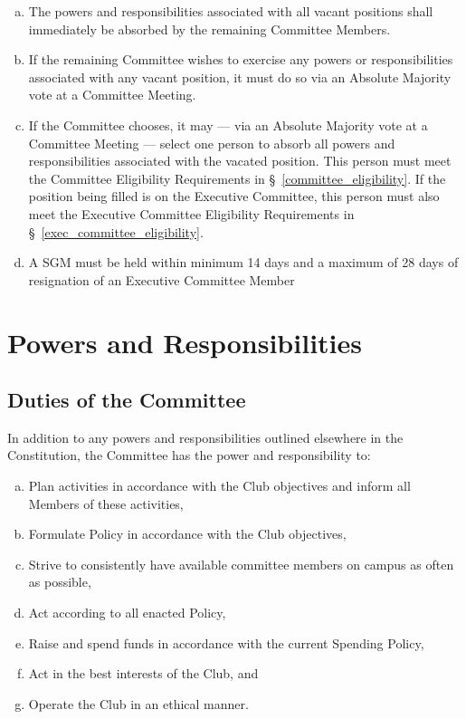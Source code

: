 \documentclass[a4paper,12pt]{article}
\begin{document}
\begin{enumerate}[a)]
	\item The powers and responsibilities associated with all vacant positions shall immediately be absorbed by the remaining Committee Members.
	\item If the remaining Committee wishes to exercise any powers or responsibilities associated with any vacant position, it must do so via an Absolute Majority vote at a Committee Meeting.
	\item If the Committee chooses, it may --- via an Absolute Majority vote at a Committee Meeting --- select one person to absorb all powers and responsibilities associated with the vacated position. This person must meet the Committee Eligibility Requirements in \S~\ref{committee_eligibility}. If the position being filled is on the Executive Committee, this person must also meet the Executive Committee Eligibility Requirements in \S~\ref{exec_committee_eligibility}.
	\item A SGM must be held within minimum 14 days and a maximum of 28 days of resignation of an Executive Committee Member
\end{enumerate}

\section{Powers and Responsibilities}

\subsection{Duties of the Committee}

In addition to any powers and responsibilities outlined elsewhere in the Constitution, the Committee has the power and responsibility to:

\begin{enumerate}[a)]
	\item Plan activities in accordance with the Club objectives and inform all Members of these activities,
	\item Formulate Policy in accordance with the Club objectives,
	\item Strive to consistently have available committee members on campus as often as possible,
	\item Act according to all enacted Policy,
	\item Raise and spend funds in accordance with the current Spending Policy,
	\item Act in the best interests of the Club, and
	\item Operate the Club in an ethical manner.
\end{enumerate}
\end{document}
